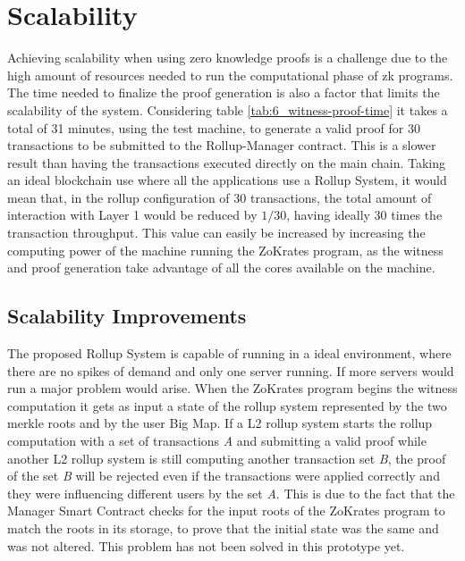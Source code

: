 \section{Scalability}

Achieving scalability when using zero knowledge proofs is a challenge due to the high amount of resources needed to run the computational phase of zk programs. The time needed to finalize the proof generation is also a factor that limits the scalability of the system. Considering table \ref{tab:6_witness-proof-time} it takes a total of 31 minutes, using the test machine, to generate a valid proof for 30 transactions to be submitted to the Rollup-Manager contract. This is a slower result than having the transactions executed directly on the main chain. Taking an ideal blockchain use where all the applications use a Rollup System, it would mean that, in the rollup configuration of 30 transactions, the total amount of interaction with Layer 1 would be reduced by $1/30$, having ideally 30 times the transaction throughput. This value can easily be increased by increasing the computing power of the machine running the ZoKrates program, as the witness and proof generation take advantage of all the cores available on the machine.

\subsection{Scalability Improvements}

The proposed Rollup System is capable of running in a ideal environment, where there are no spikes of demand and only one server running. If more servers would run a major problem would arise. When the ZoKrates program begins the witness computation it gets as input a state of the rollup system represented by the two merkle roots and by the user Big Map. If a L2 rollup system starts the rollup computation with a set of transactions \textit{A} and submitting a valid proof while another L2 rollup system is still computing another transaction set \textit{B}, the proof of the set \textit{B} will be rejected even if the transactions were applied correctly and they were influencing different users by the set \textit{A}. This is due to the fact that the Manager Smart Contract checks for the input roots of the ZoKrates program to match the roots in its storage, to prove that the initial state was the same and was not altered. This problem has not been solved in this prototype yet.

